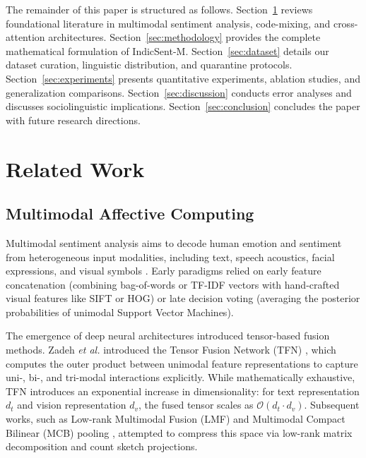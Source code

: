 \documentclass[10pt,journal,compsoc]{IEEEtran}
\begin{document}
The remainder of this paper is structured as follows. Section~\ref{sec:related_work} reviews foundational literature in multimodal sentiment analysis, code-mixing, and cross-attention architectures. Section~\ref{sec:methodology} provides the complete mathematical formulation of IndicSent-M. Section~\ref{sec:dataset} details our dataset curation, linguistic distribution, and quarantine protocols. Section~\ref{sec:experiments} presents quantitative experiments, ablation studies, and generalization comparisons. Section~\ref{sec:discussion} conducts error analyses and discusses sociolinguistic implications. Section~\ref{sec:conclusion} concludes the paper with future research directions.

\section{Related Work}
\label{sec:related_work}

\subsection{Multimodal Affective Computing}
Multimodal sentiment analysis aims to decode human emotion and sentiment from heterogeneous input modalities, including text, speech acoustics, facial expressions, and visual symbols \cite{baltruvsaitis2018multimodal, poria2020beneath}. Early paradigms relied on early feature concatenation (combining bag-of-words or TF-IDF vectors with hand-crafted visual features like SIFT or HOG) or late decision voting (averaging the posterior probabilities of unimodal Support Vector Machines).

The emergence of deep neural architectures introduced tensor-based fusion methods. Zadeh \textit{et al.} introduced the Tensor Fusion Network (TFN) \cite{zadeh2017tensor}, which computes the outer product between unimodal feature representations to capture uni-, bi-, and tri-modal interactions explicitly. While mathematically exhaustive, TFN introduces an exponential increase in dimensionality: for text representation $d_t$ and vision representation $d_v$, the fused tensor scales as $\mathcal{O}(d_t \cdot d_v)$. Subsequent works, such as Low-rank Multimodal Fusion (LMF) \cite{zadeh2018multimodal} and Multimodal Compact Bilinear (MCB) pooling \cite{fukui2016multimodal}, attempted to compress this space via low-rank matrix decomposition and count sketch projections. 
\end{document}
